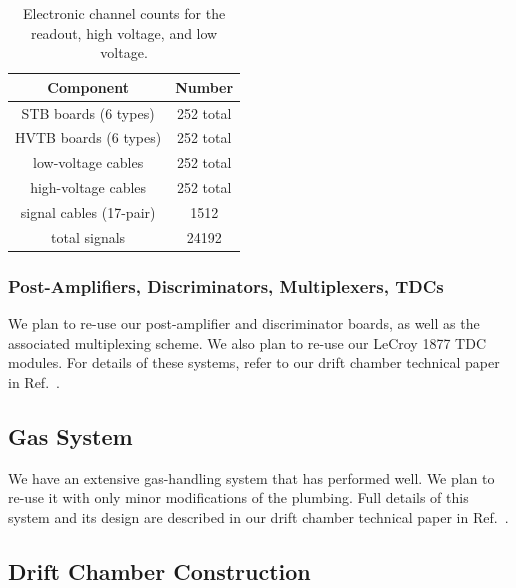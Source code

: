 \begin{table}[htbp]
\begin{center}
\begin{tabular} {||c|c||} \hline \hline
{\bf Component}           & {\bf Number} \\ \hline
STB boards (6 types)      & 252 total \\ \hline
HVTB boards (6 types)     & 252 total \\ \hline
low-voltage cables        & 252 total  \\ \hline
high-voltage cables       & 252 total  \\ \hline
signal cables (17-pair)   & 1512 \\ \hline
total signals             & 24192 \\ \hline \hline
\end{tabular}
\caption{\small{Electronic channel counts for the readout, high voltage,
and low voltage.}}
\label{electronic-channels}
\end{center}
\end{table}

\subsubsection{Post-Amplifiers, Discriminators, Multiplexers, TDCs}

We plan to re-use our post-amplifier and discriminator boards, as well
as the associated multiplexing scheme.  We also plan to re-use our LeCroy 
1877 TDC modules.  For details of these systems, refer to our drift chamber 
technical paper in Ref.~\cite{dcnim}.

\subsection{Gas System}

We have an extensive gas-handling system that has performed well.  We plan 
to re-use it with only minor modifications of the plumbing.  Full details 
of this system and its design are described in our drift chamber technical 
paper in Ref.~\cite{dcnim}.

\subsection{Drift Chamber Construction}


